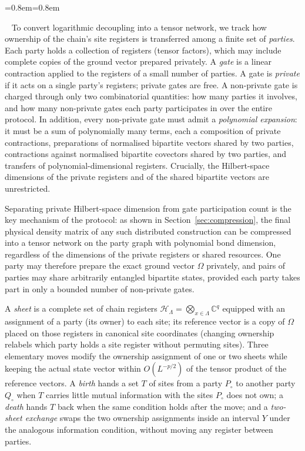 \documentclass[aps,prx,reprint,superscriptaddress,floatfix,nofootinbib,longbibliography,amsmath,amssymb]{revtex4-2}
\newcommand{\C}{\mathbb C}
\newcommand{\cH}{\mathcal H}
\newcommand{\Om}{\Omega}
\newcommand{\Lam}{\Lambda}
\theoremstyle{plain}
\theoremstyle{definition}
\newenvironment{inwords}{%
  \par\medskip\noindent
  \begin{list}{}{\leftmargin=0.8em\rightmargin=0.8em}
  \item\relax
  \noindent{\sffamily\bfseries\color{blue!40!black}In words.}\ \sffamily\small}{%
  \end{list}\par\medskip}
\begin{document}
\begin{inwords}
To convert logarithmic decoupling into a tensor network, we track how
ownership of the chain's site registers is transferred among a finite set of
\emph{parties}. Each party holds a collection of registers (tensor factors),
which may include complete copies of the ground vector prepared privately. A
\emph{gate} is a linear contraction applied to the registers of a small
number of parties. A gate is \emph{private} if it acts on a single party's
registers; private gates are free. A non-private gate is charged through
only two combinatorial quantities: how many parties it involves, and how
many non-private gates each party participates in over the entire protocol.
In addition, every non-private gate must admit a \emph{polynomial
expansion}: it must be a sum of polynomially many terms, each a composition
of private contractions, preparations of normalised bipartite vectors shared
by two parties, contractions against normalised bipartite covectors shared by
two parties, and transfers of polynomial-dimensional registers. Crucially,
the Hilbert-space dimensions of the private registers and of the shared
bipartite vectors are unrestricted.

Separating private Hilbert-space dimension from gate participation count is
the key mechanism of the protocol: as shown in Section~\ref{sec:compression},
the final physical density matrix of any such distributed construction can be
compressed into a tensor network on the party graph with polynomial bond
dimension, regardless of the dimensions of the private registers or shared
resources. One party may therefore prepare the exact ground vector $\Om$
privately, and pairs of parties may share arbitrarily entangled bipartite
states, provided each party takes part in only a bounded number of
non-private gates.

A \emph{sheet} is a complete set of chain registers
$\cH_\Lam=\bigotimes_{x\in\Lam}\C^q$ equipped with an assignment of a party
(its owner) to each site; its reference vector is a copy of $\Om$ placed on
those registers in canonical site coordinates (changing ownership relabels
which party holds a site register without permuting sites). Three elementary
moves modify the ownership assignment of one or two sheets while keeping the
actual state vector within $O(L^{-p/2})$ of the tensor product of the
reference vectors. A \emph{birth} hands a set $T$ of sites from a party
$P_\circ$ to another party $Q_\circ$ when $T$ carries little mutual
information with the sites $P_\circ$ does not own; a \emph{death} hands $T$
back when the same condition holds after the move; and a \emph{two-sheet
exchange} swaps the two ownership assignments inside an interval $Y$ under
the analogous information condition, without moving any register between
parties.
\end{inwords}
\end{document}
